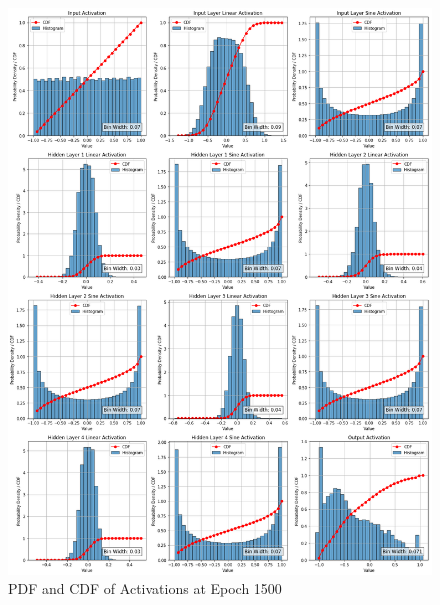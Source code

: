 \documentclass{ioereport}
\begin{document}
    \begin{figure}[H]
        \centering
        \includegraphics[width=\linewidth]{assets/video histogram/epoch1500activations.png}
        \caption{PDF and CDF of Activations at Epoch 1500}
        \label{fig:video-activation-1500}
    \end{figure}
\end{document}

